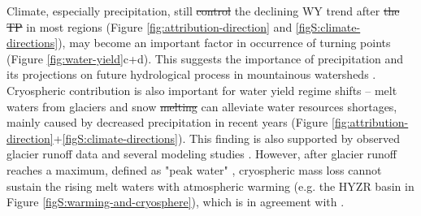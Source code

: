 \documentclass[hess, manuscript]{copernicus}
\providecommand{\DIFaddtex}[1]{{\protect\color{blue}\uwave{#1}}} %
\providecommand{\DIFdeltex}[1]{{\protect\color{red}\sout{#1}}}                      %
\providecommand{\DIFaddbegin}{} %
\providecommand{\DIFaddend}{} %
\providecommand{\DIFdelbegin}{} %
\providecommand{\DIFdelend}{} %
\providecommand{\DIFadd}[1]{\texorpdfstring{\DIFaddtex{#1}}{#1}} %
\providecommand{\DIFdel}[1]{\texorpdfstring{\DIFdeltex{#1}}{}} %
\begin{document}
Climate, especially precipitation, still \DIFdelbegin \DIFdel{control }\DIFdelend \DIFaddbegin \DIFadd{controls }\DIFaddend the declining WY trend after \DIFdelbegin \DIFdel{the TP }\DIFdelend \DIFaddbegin \DIFadd{Tp }\DIFaddend in most regions (Figure \ref{fig:attribution-direction} and \ref{figS:climate-directions}), \DIFaddbegin \DIFadd{and }\DIFaddend may become an important factor in occurrence of turning points (Figure \ref{fig:water-yield}c+d). This suggests the importance of precipitation and its projections on future hydrological process in mountainous watersheds \citep{lutz2014consistent}. Cryospheric contribution is also important for water yield regime shifts -- melt waters from glaciers and snow \DIFdelbegin \DIFdel{melting }\DIFdelend can alleviate water resources shortages, mainly caused by decreased precipitation in recent years (Figure \ref{fig:attribution-direction}+\ref{figS:climate-directions}). This finding is also supported by observed glacier runoff data \citep{yao2010glacial} and several modeling studies \citep{lutz2014consistent, Zhang2020VariationOM, wang2021tp}. However, after glacier runoff reaches a maximum, defined as "peak water" \citep{gleick2010peak}, cryospheric mass loss cannot sustain the rising melt waters with atmospheric warming (e.g. the HYZR basin in Figure \ref{figS:warming-and-cryosphere}), which is in agreement with \citet{huss2018global}. 
\end{document}
